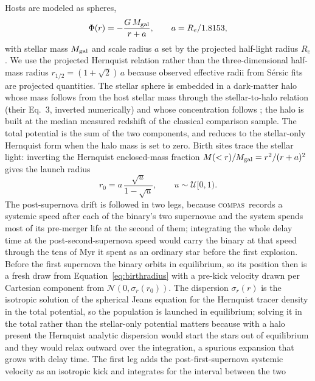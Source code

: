 \documentclass[twocolumn,apj]{openjournal}
\newcommand{\compas}{\textsc{compas}}
\begin{document}
Hosts are modeled as \citet{hernquist1990} spheres,
\begin{equation}
\Phi(r) = -\frac{G\,M_{\rm gal}}{r + a}, \qquad a = R_e / 1.8153,
\label{eq:hernquist}
\end{equation}
with stellar mass $M_{\rm gal}$ and scale radius $a$ set by the projected
half-light radius $R_e$. We use the projected Hernquist relation rather than
the three-dimensional half-mass radius $r_{1/2} = (1+\sqrt{2})\,a$ because
observed effective radii from S\'ersic fits are projected quantities. The
stellar sphere is embedded in a \citet{navarro1997} dark-matter halo whose
mass follows from the host stellar mass through the \citet{behroozi2013}
stellar-to-halo relation (their Eq.~3, inverted numerically) and whose
concentration follows \citet{dutton2014}; the halo is built at the median
measured redshift of the classical comparison sample. The total potential is
the sum of the two components, and reduces to the stellar-only Hernquist form
when the halo mass is set to zero. Birth
sites trace the stellar light: inverting the Hernquist enclosed-mass fraction
$M(<r)/M_{\rm gal} = r^2/(r+a)^2$ gives the launch radius
\begin{equation}
r_0 = a\,\frac{\sqrt{u}}{1 - \sqrt{u}}, \qquad u \sim \mathcal{U}[0, 1).
\label{eq:birthradius}
\end{equation}
The post-supernova drift is followed in two legs, because \compas\ records a
systemic speed after each of the binary's two supernovae and the system spends
most of its pre-merger life at the second of them; integrating the whole delay
time at the post-second-supernova speed would carry the binary at that speed
through the tens of Myr it spent as an ordinary star before the first explosion.
Before the first supernova the binary orbits in equilibrium, so its position
then is a fresh draw from Equation~\eqref{eq:birthradius} with a pre-kick
velocity drawn per Cartesian component from $\mathcal{N}(0, \sigma_r(r_0))$. The
dispersion $\sigma_r(r)$ is the isotropic solution of the spherical Jeans
equation for the Hernquist tracer density in the total potential, so the
population is launched in equilibrium; solving it in the total rather than the
stellar-only potential matters because with a halo present the Hernquist
analytic dispersion would start the stars out of equilibrium and they would
relax outward over the integration, a spurious expansion that grows with delay
time. The first leg adds the post-first-supernova systemic velocity as an
isotropic kick \citep{bloom1999} and integrates for the interval between the two
\end{document}
